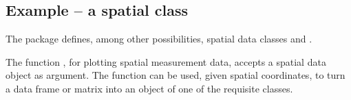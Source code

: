 \subsection*{Example -- a spatial class}\label{ss:bubble}

The  package defines, among other possibilities, spatial data
classes  and .

The  function , for plotting spatial measurement data,
accepts a spatial data object as argument.
The function  can be used, given spatial coordinates,
to turn a data frame or matrix into an object of one of the requisite
classes.


